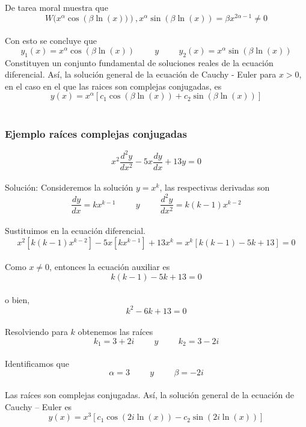 \documentclass[12pt,letterpaper]{article}
\begin{document}
De tarea moral muestra que\\
$$W(x^{\alpha}\cos\left(\beta\ln(x))\right),x^{\alpha}\sin\left(\beta\ln(x)\right)=\beta{x^{2\alpha-1}}\neq0$$\\
Con esto se concluye que\\
$$y_{1}(x)=x^{\alpha}\cos\left(\beta\ln(x)\right)\hspace{1cm}y\hspace{1cm}y_{2}(x)=x^{\alpha}\sin\left(\beta\ln(x)\right)$$
Constituyen un conjunto fundamental de soluciones reales de la ecuación diferencial. Así, la solución general de la ecuación de Cauchy - Euler para $x>0$, en el caso en el que las raices son complejas conjugadas, es\\
$$y(x)=x^{\alpha}\left[c_{1}\cos\left(\beta\ln(x)\right)+c_{2}\sin\left(\beta\ln(x)\right)\right]$$\\
\subsubsection{Ejemplo raíces complejas conjugadas} 
$$x^{2} \dfrac{d^{2}y}{dx^{2}} -5x \dfrac{dy}{dx} +13y = 0$$\\
Solución: Consideremos la solución $y = x^{k}$, las respectivas derivadas son\\
$$\frac{dy}{dx} = kx^{k -1} \hspace{1cm} y \hspace{1cm} \dfrac{d^{2}y}{dx^{2}} = k(k -1)x^{k -2}$$\\
Sustituimos en la ecuación diferencial.\\
$$x^{2} \left[ k(k -1)x^{k -2} \right] -5x \left[ kx^{k -1} \right] +13x^{k} = x^{k} \left[ k(k -1) -5k + 13 \right] = 0$$\\
Como $x \neq 0$, entonces la ecuación auxiliar es\\
$$k(k -1) -5k + 13 = 0$$\\
o bien,
$$k^{2} -6k + 13 = 0$$\\
Resolviendo para $k$ obtenemos las raíces\\
$$k_{1} = 3+2i \hspace{1cm} y \hspace{1cm} k_{2} = 3-2i$$\\
Identificamos que\\
$$\alpha = 3 \hspace{1cm} y \hspace{1cm} \beta = -2i$$\\
Las raíces son complejas conjugadas. Así, la solución general de la ecuación de Cauchy – Euler es\\
$$y(x) = x^{3} \left[ c_{1} \cos \left( 2i \ln (x) \right) - c_{2} \sin \left( 2i \ln (x) \right) \right]$$\\
\end{document}
